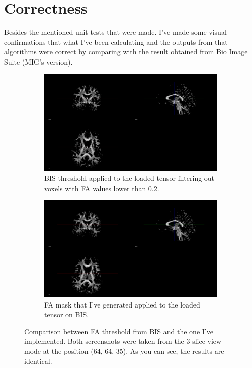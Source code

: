 \documentclass[a4paper,11pt]{report}
\begin{document}
  \section{Correctness}
  Besides the mentioned unit tests that were made. I've made some visual confirmations that what I've been calculating and the outputs from that algorithms were correct by comparing with the result obtained from Bio Image Suite (MIG's version).

  \begin{figure}[!ht]
    \centering

    \begin{subfigure}[t]{.49\textwidth}
      \includegraphics[width=1\linewidth]{img/bis_fa_threshold.png}
      \caption{BIS threshold applied to the loaded tensor filtering out voxels with FA values lower than 0.2.}
      \label{subfig:bis_fa_threshold}
    \end{subfigure}\hfill%
    \begin{subfigure}[t]{.49\textwidth}
      \includegraphics[width=1\linewidth]{img/my_fa_threshold.png}
      \caption{FA mask that I've generated applied to the loaded tensor on BIS.}
      \label{subfig:my_fa_threshold}
    \end{subfigure}

    \caption{Comparison between FA threshold from BIS and the one I've implemented. Both screenshots were taken from the 3-slice view mode at the position (64, 64, 35). As you can see, the results are identical.}
    \label{fig:bis-my-comparison}
  \end{figure}
\end{document}

